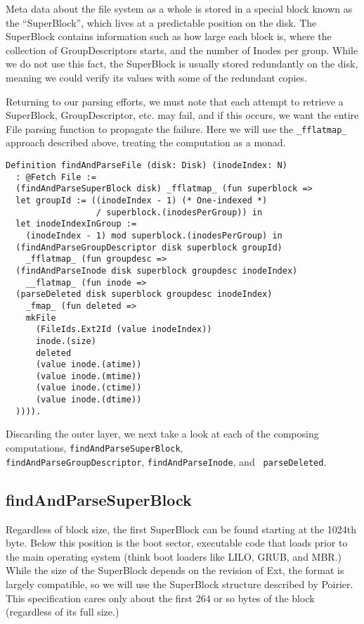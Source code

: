 \documentclass[nocopyrightspace,preprint]{sigplanconf}
\begin{document}
Meta data about the file system as a whole is stored in a special block known
as the ``SuperBlock'', which lives at a predictable position on the disk. The
SuperBlock contains information such as how large each block is, where the
collection of GroupDescriptors starts, and the number of Inodes per group.
While we do not use this fact, the SuperBlock is usually stored redundantly on
the disk, meaning we could verify its values with some of the redundant
copies.

Returning to our parsing efforts, we must note that each attempt to retrieve a
SuperBlock, GroupDescriptor, etc. may fail, and if this occurs, we want the
entire File parsing function to propagate the failure. Here we will use the
{\tt \_fflatmap\_} approach described above, treating the computation as a
monad.

\begin{lstlisting}
Definition findAndParseFile (disk: Disk) (inodeIndex: N) 
  : @Fetch File :=
  (findAndParseSuperBlock disk) _fflatmap_ (fun superblock =>
  let groupId := ((inodeIndex - 1) (* One-indexed *)
                  / superblock.(inodesPerGroup)) in
  let inodeIndexInGroup := 
    (inodeIndex - 1) mod superblock.(inodesPerGroup) in
  (findAndParseGroupDescriptor disk superblock groupId) 
    _fflatmap_ (fun groupdesc =>
  (findAndParseInode disk superblock groupdesc inodeIndex) 
    __flatmap_ (fun inode =>
  (parseDeleted disk superblock groupdesc inodeIndex) 
    _fmap_ (fun deleted =>
    mkFile
      (FileIds.Ext2Id (value inodeIndex))
      inode.(size)
      deleted
      (value inode.(atime))
      (value inode.(mtime))
      (value inode.(ctime))
      (value inode.(dtime))
  )))).
\end{lstlisting}

Discarding the outer layer, we next take a look at each of the composing
computations, {\tt findAndParseSuperBlock}, \\
{\tt findAndParseGroupDescriptor}, {\tt findAndParseInode}, and {\tt
parseDeleted}.

\subsection{findAndParseSuperBlock}

Regardless of block size, the first SuperBlock can be found starting at the
1024th byte. Below this position is the boot sector, executable code that
loads prior to the main operating system (think boot loaders like LILO, GRUB,
and MBR.) While the size of the SuperBlock depends on the revision of Ext, the
format is largely compatible, so we will use the SuperBlock structure
described by Poirier. This specification cares only about the first 264 or so
bytes of the block (regardless of its full size.)
\end{document}
